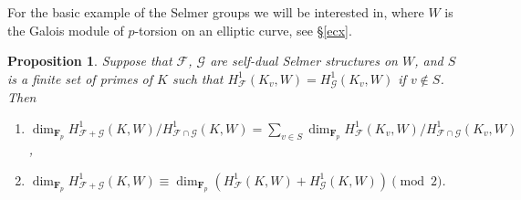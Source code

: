 \documentclass[reqno]{amsart}
\newtheorem{prop}[thm]{Proposition}
\theoremstyle{definition}
\def\F{\mathbf{F}}
\def\Fp{\F_p}
\def\cF{\mathcal{F}}
\def\cG{\mathcal{G}}
\def\T{W}
\def\Hs#1{H^1_{#1}}
\def\HF{\Hs{\cF}}
\def\HG{\Hs{\cG}}
\def\rf{\Fp}
\begin{document}
For the basic example of the Selmer groups we 
will be interested in, where $\T$ is the Galois module of 
$p$-torsion on an elliptic curve, see \S\ref{ecx}.

\begin{prop}
\label{globdual}
Suppose that
$\cF$, $\cG$ are self-dual Selmer structures on $\T$, 
and $S$ is a finite set of primes of $K$ 
such that $\HF(K_v,\T) = \HG(K_v,\T)$ if $v \notin S$.  Then
\begin{enumerate}
\item
$\dim_{\rf}\Hs{\cF+\cG}(K,\T)/\Hs{\cF\cap\cG}(K,\T) 
    = \displaystyle\sum_{v \in S}\dim_{\rf}\HF(K_v,\T)/\Hs{\cF\cap\cG}(K_v,\T)$,
\item
$\dim_{\rf}\Hs{\cF+\cG}(K,\T) \equiv \dim_{\rf}(\HF(K,\T)+\HG(K,\T)) \pmod{2}$.
\end{enumerate}
\end{prop}
\end{document}
